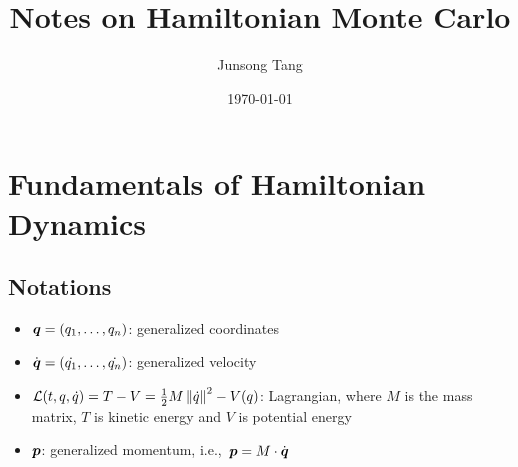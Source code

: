 \documentclass[hidelinks]{article}[12pt]
\title{\bf Notes on Hamiltonian Monte Carlo}
\author{Junsong Tang}
\date{\today}
\begin{document}
\maketitle


\section{Fundamentals of Hamiltonian Dynamics}
\subsection{Notations}
\begin{itemize}
    \item $\boldsymbol{q} = (q_1, \ldots, q_n)$: generalized coordinates
    \item $\dot{\boldsymbol{q}} = (\dot{q_1}, \ldots, \dot{q_n})$: generalized velocity
    \item ${\cal L}(t, q, \dot{q}) = T - V = \frac12 M \left\lVert\dot{q}\right\rVert^2 - V(q) $: Lagrangian, where $M$ is the mass matrix, $T$ is kinetic energy and $V$ is potential energy
    \item $\boldsymbol{p}$: generalized momentum, i.e.,\ $\boldsymbol{p} = M \cdot \dot{\boldsymbol{q}}$
\end{itemize}
\end{document}
